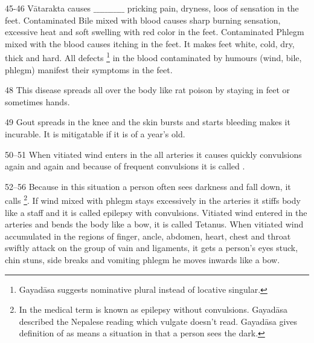 \begin{translation}
\item[45-46] Vātarakta causes $\_\_\_\_\_\_\_\_\_\_\_$ pricking pain, dryness, loos of 
sensation in the feet. Contaminated Bile mixed with blood causes sharp burning 
sensation, excessive heat and soft swelling with red color in the feet. Contaminated 
Phlegm mixed with the blood causes itching in the feet. It makes feet white, cold, 
dry, thick and hard. All defects \footnote{Gayadāsa suggests  nominative plural instead of locative singular.} in the blood contaminated by 
humours (wind, bile, phlegm) manifest their symptoms in the feet.

\item[48] This disease spreads all over the body like rat poison by staying in feet or sometimes hands.

\item[49] Gout spreads in the knee and the skin bursts and starts bleeding makes it incurable. It is mitigatable if it is of a year’s old.

\item[50--51] When vitiated wind enters in the all arteries it causes quickly 
convulsions again and again and because of frequent convulsions  it is 
called .

\item[52--56] Because in this situation a person often sees darkness and
fall down, it calls  \footnote{In the medical term
     is known as epilepsy without convulsions. Gayadāsa described
    the Nepalese reading  which vulgate doesn’t read. Gayadāsa
    gives definition of  as  means a situation
    in that a person sees the dark.}. If wind mixed with phlegm stays
    excessively in the arteries it stiffs body like a staff and it is called
     epilepsy with convulsions. Vitiated wind entered in the
    arteries and bends the body like a bow, it is called 
    Tetanus. When vitiated wind accumulated in the regions of finger, ancle,
    abdomen, heart, chest and throat swiftly attack on the group of vain and
    ligaments, it gets a person’s eyes stuck, chin stuns, side breaks and
    vomiting phlegm he moves inwards like a bow.

\end{translation}